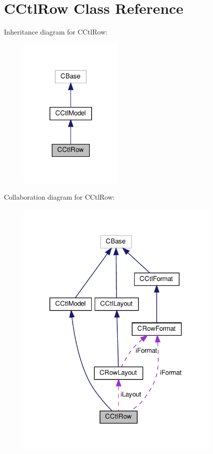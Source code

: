 \hypertarget{classCCtlRow}{}\section{C\+Ctl\+Row Class Reference}
\label{classCCtlRow}


Inheritance diagram for C\+Ctl\+Row\+:
\nopagebreak
\begin{figure}[H]
\begin{center}
\leavevmode
\includegraphics[width=143pt]{classCCtlRow__inherit__graph}
\end{center}
\end{figure}


Collaboration diagram for C\+Ctl\+Row\+:
\nopagebreak
\begin{figure}[H]
\begin{center}
\leavevmode
\includegraphics[width=282pt]{classCCtlRow__coll__graph}
\end{center}
\end{figure}
